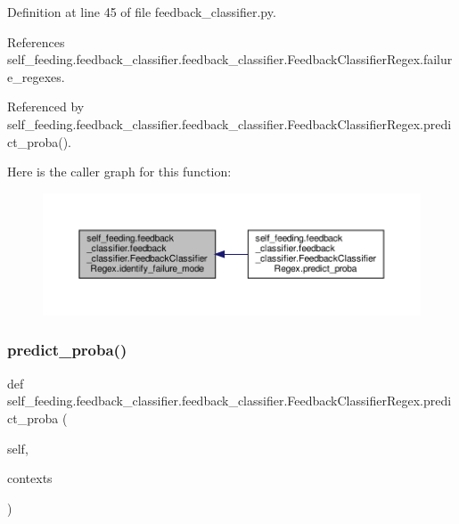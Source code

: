 Definition at line 45 of file feedback\+\_\+classifier.\+py.



References self\+\_\+feeding.\+feedback\+\_\+classifier.\+feedback\+\_\+classifier.\+Feedback\+Classifier\+Regex.\+failure\+\_\+regexes.



Referenced by self\+\_\+feeding.\+feedback\+\_\+classifier.\+feedback\+\_\+classifier.\+Feedback\+Classifier\+Regex.\+predict\+\_\+proba().

Here is the caller graph for this function\+:
\nopagebreak
\begin{figure}[H]
\begin{center}
\leavevmode
\includegraphics[width=350pt]{classself__feeding_1_1feedback__classifier_1_1feedback__classifier_1_1FeedbackClassifierRegex_a53f9a6c99688e0da9304aefb5148d508_icgraph}
\end{center}
\end{figure}
\mbox{\label{classself__feeding_1_1feedback__classifier_1_1feedback__classifier_1_1FeedbackClassifierRegex_a556ca2e477a4c21107241fbde7f2f8ab}} 
\subsubsection{\texorpdfstring{predict\+\_\+proba()}{predict\_proba()}}
{\footnotesize\ttfamily def self\+\_\+feeding.\+feedback\+\_\+classifier.\+feedback\+\_\+classifier.\+Feedback\+Classifier\+Regex.\+predict\+\_\+proba (\begin{DoxyParamCaption}\item[{}]{self,  }\item[{}]{contexts }\end{DoxyParamCaption})}



